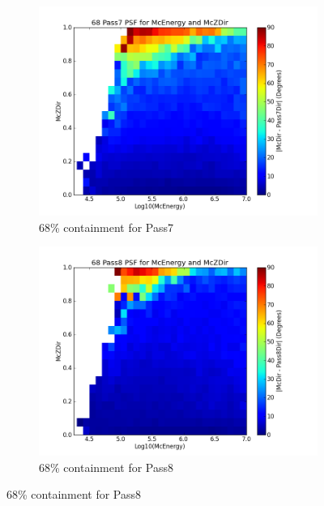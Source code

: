 \documentclass[11pt]{article}
\begin{document}
\begin{figure}[h]
        \centering
        \begin{subfigure}[b]{0.5\textwidth}
                \centering
                \includegraphics[width=\textwidth]{psf68_2D_pass7}
                \caption{68\% containment for Pass7}
                \label{con68_old}
        \end{subfigure}%
        \begin{subfigure}[b]{0.5\textwidth}
                \centering
                \includegraphics[width=\textwidth]{psf68_2D_pass8}
                \caption{68\% containment for Pass8}
                \label{con68_pass8}
        \end{subfigure}

\end{figure}
\end{document}
